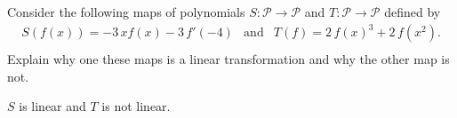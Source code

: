 
\begin{exerciseStatement}


Consider the following maps of polynomials \(S:\mathcal{P}\rightarrow\mathcal{P}\) and \(T:\mathcal{P}\rightarrow\mathcal{P}\) defined by 
\begin{align*} S(f(x))= -3 \, x f\left(x\right) - 3 \, f'\left(-4\right)  & \text{and} & T(f)= 2 \, f\left(x\right)^{3} + 2 \, f\left(x^{2}\right) . \\ \end{align*}
             Explain why one these maps is a linear transformation and why the other map is not. 


\end{exerciseStatement}
    
\begin{exerciseAnswer} 


\(S\) is linear and \(T\) is not linear.


\end{exerciseAnswer}
    
